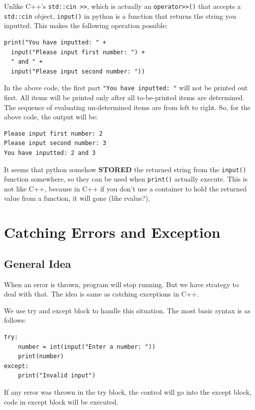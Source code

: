 \documentclass[12pt]{book}
\begin{document}
Unlike C++'s \texttt{std::cin >>}, which is actually an \texttt{operator>>()} that accepts a \texttt{std::cin} object, \texttt{input()} in python is a function that returns the string you inputted. This makes the following operation possible:
\begin{verbatim}
print("You have inputted: " +
  input("Please input first number: ") +
  " and " +
  input("Please input second number: "))
\end{verbatim}
In the above code, the first part \texttt{"You have inputted: "} will not be printed out first. All items will be printed only after all to-be-printed items are determined. The sequence of evaluating un-determined items are from left to right. So, for the above code, the output will be:
\begin{verbatim}
Please input first number: 2
Please input second number: 3
You have inputted: 2 and 3
\end{verbatim}

It seems that python somehow \textbf{STORED} the returned string from the \texttt{input()} function somewhere, so they can be used when \texttt{print()} actually execute. This is not like C++, because in C++ if you don't use a container to hold the returned value from a function, it will gone (like rvalue?).
\chapter{Catching Errors and Exception}
\label{sec:orgbc56600}
\section{General Idea}
\label{sec:org2168823}
When an error is thrown, program will stop running. But we have strategy to deal with that. The idea is same as catching exceptions in C++.

We use try and except block to handle this situation. The most basic syntax is as follows:
\begin{verbatim}
try:
    number = int(input("Enter a number: "))
    print(number)
except:
    print("Invalid input")
\end{verbatim}
If any error was thrown in the try block, the control will go into the except block, code in except block will be executed.
\end{document}
